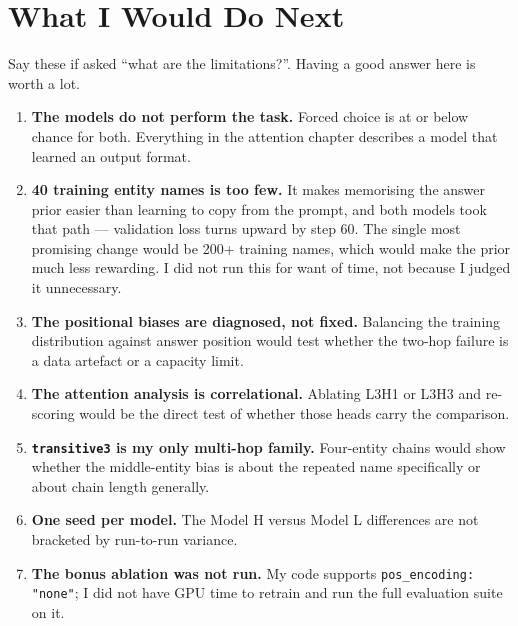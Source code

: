 \documentclass[11pt]{report}
\newcommand{\p}[1]{\texttt{#1}}
\begin{document}
\chapter{What I Would Do Next}

Say these if asked ``what are the limitations?''. Having a good answer here is
worth a lot.

\begin{enumerate}[leftmargin=*]
\item \textbf{The models do not perform the task.} Forced choice is at or below
      chance for both. Everything in the attention chapter describes a model
      that learned an output format.

\item \textbf{40 training entity names is too few.} It makes memorising the
      answer prior easier than learning to copy from the prompt, and both models
      took that path --- validation loss turns upward by step 60. The single
      most promising change would be 200+ training names, which would make the
      prior much less rewarding. I did not run this for want of time, not
      because I judged it unnecessary.

\item \textbf{The positional biases are diagnosed, not fixed.} Balancing the
      training distribution against answer position would test whether the
      two-hop failure is a data artefact or a capacity limit.

\item \textbf{The attention analysis is correlational.} Ablating L3H1 or L3H3 and
      re-scoring would be the direct test of whether those heads carry the
      comparison.

\item \textbf{\p{transitive3} is my only multi-hop family.} Four-entity chains
      would show whether the middle-entity bias is about the repeated name
      specifically or about chain length generally.

\item \textbf{One seed per model.} The Model H versus Model L differences are not
      bracketed by run-to-run variance.

\item \textbf{The bonus ablation was not run.} My code supports
      \p{pos\_encoding: "none"}; I did not have GPU time to retrain and run the
      full evaluation suite on it.
\end{enumerate}
\end{document}
